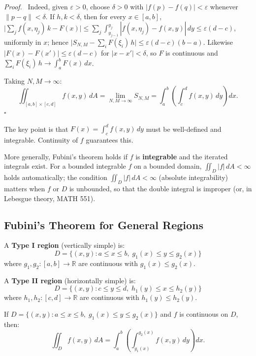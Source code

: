 \documentclass[11pt]{report}
\renewenvironment{proof}[1][Proof]{\par\noindent\textit{#1.}\ }{\hfill$\square$\par\medskip}
\newcommand{\R}{\mathbb{R}}
\begin{document}
\begin{proof}
Indeed, given $\varepsilon > 0$, choose $\delta > 0$ with $|f(p) - f(q)| < \varepsilon$ whenever $\|p - q\| < \delta$. If $h, k < \delta$, then for every $x \in [a, b]$, $\big|\sum_{j} f(x, \eta_j)\, k - F(x)\big| \leq \sum_j \int_{y_{j-1}}^{y_j} |f(x, \eta_j) - f(x, y)| \, dy \leq \varepsilon (d - c)$, uniformly in $x$; hence $\big|S_{N,M} - \sum_i F(\xi_i)\, h\big| \leq \varepsilon (d - c)(b - a)$. Likewise $|F(x) - F(x')| \leq \varepsilon (d - c)$ for $|x - x'| < \delta$, so $F$ is continuous and $\sum_i F(\xi_i)\, h \to \int_a^b F(x)\, dx$.

Taking $N, M \to \infty$:
\[
\iint_{[a,b] \times [c,d]} f(x, y) \, dA = \lim_{N,M \to \infty} S_{N,M} = \int_a^b \left( \int_c^d f(x, y) \, dy \right) dx.
\]
\end{proof}

\begin{remark}
The key point is that $F(x) = \int_c^d f(x, y) \, dy$ must be well-defined and integrable. Continuity of $f$ guarantees this. 

More generally, Fubini's theorem holds if $f$ is \textbf{integrable} and the iterated integrals exist. For a bounded integrable $f$ on a bounded domain, $\iint_D |f| \, dA < \infty$ holds automatically; the condition $\iint_D |f| \, dA < \infty$ (absolute integrability) matters when $f$ or $D$ is unbounded, so that the double integral is improper (or, in Lebesgue theory, MATH 551).
\end{remark}

\subsection*{Fubini's Theorem for General Regions}

\begin{definition}
A \textbf{Type I region} (vertically simple) is:
\[
D = \{(x, y) : a \leq x \leq b, \; g_1(x) \leq y \leq g_2(x)\}
\]
where $g_1, g_2: [a, b] \to \R$ are continuous with $g_1(x) \leq g_2(x)$.

A \textbf{Type II region} (horizontally simple) is:
\[
D = \{(x, y) : c \leq y \leq d, \; h_1(y) \leq x \leq h_2(y)\}
\]
where $h_1, h_2: [c, d] \to \R$ are continuous with $h_1(y) \leq h_2(y)$.
\end{definition}

\begin{theorem}
If $D = \{(x, y) : a \leq x \leq b, \; g_1(x) \leq y \leq g_2(x)\}$ and $f$ is continuous on $D$, then:
\[
\iint_D f(x, y) \, dA = \int_a^b \left( \int_{g_1(x)}^{g_2(x)} f(x, y) \, dy \right) dx.
\]
\end{theorem}
\end{document}
